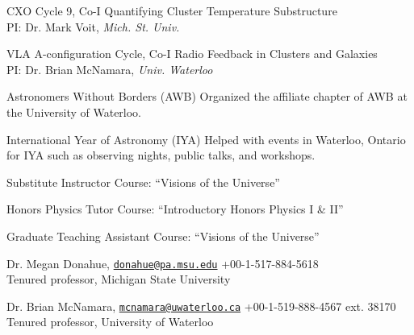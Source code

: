 \documentclass[12pt]{cv}
\begin{document}
\begin{llist}
CXO Cycle 9, Co-I
Quantifying Cluster Temperature Substructure\\%
PI: Dr. Mark Voit, {\textit{Mich. St. Univ.}}

VLA A-configuration Cycle, Co-I
Radio Feedback in Clusters and Galaxies\\%
PI: Dr. Brian McNamara, {\textit{Univ. Waterloo}}


Astronomers Without Borders (AWB)
Organized the affiliate chapter of AWB at the University of Waterloo.

International Year of Astronomy (IYA)
Helped with events in Waterloo, Ontario for IYA such as observing nights, public talks, and workshops.


Substitute Instructor
Course: ``Visions of the Universe''

Honors Physics Tutor
Course: ``Introductory Honors Physics I \& II''

Graduate Teaching Assistant
Course: ``Visions of the Universe''




Dr. Megan Donahue, \href{mailto:donahue@pa.msu.edu}{\tt donahue@pa.msu.edu} \hfill +00-1-517-884-5618\\
Tenured professor, Michigan State University

Dr. Brian McNamara, \href{mailto:mcnamara@uwaterloo.ca}{\tt mcnamara@uwaterloo.ca} \hfill +00-1-519-888-4567 ext. 38170\\
Tenured professor, University of Waterloo


\end{llist}
\end{document}

